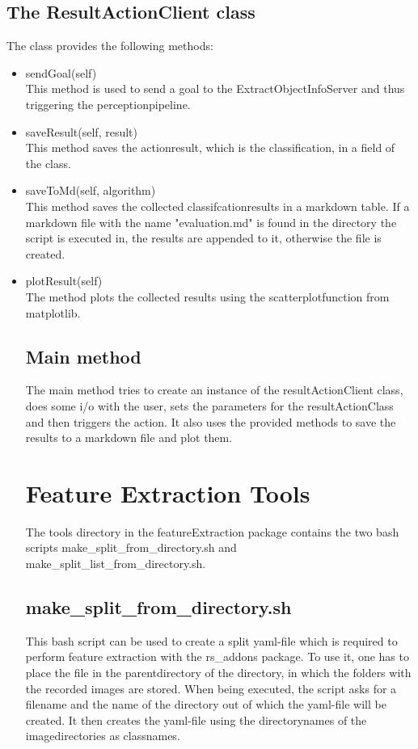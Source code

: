 \documentclass[main.tex]{subfiles}
\begin{document}
\subsection{The ResultActionClient class}
The class provides the following methods:

\begin{itemize}
\item 
sendGoal(self)\\
This method is used to send a goal to the ExtractObjectInfoServer and thus triggering the perceptionpipeline.

\item saveResult(self, result)\\
This method saves the actionresult, which is the classification, in a field of the class.

\item saveToMd(self, algorithm)\\
This method saves the collected classifcationresults in a markdown table. If a markdown file with the name "evaluation.md" is found in the directory the script is executed in, the results are appended to it, otherwise the file is created.

\item plotResult(self)\\
The method plots the collected results using the scatterplotfunction from matplotlib.

\subsection{Main method}
The main method tries to create an instance of the resultActionClient class, does some i/o with the user, sets the parameters for the resultActionClass and then triggers the action. It also uses the provided methods to save the results to a markdown file and plot them.

\section{Feature Extraction Tools}
The tools directory in the featureExtraction package contains the two bash scripts make\_split\_from\_directory.sh and make\_split\_list\_from\_directory.sh.

\subsection{make\_split\_from\_directory.sh} 
This bash script can be used to create a split yaml-file which is required to perform feature extraction with the rs\_addons package. To use it, one has to place the file in the parentdirectory of the directory, in which the folders with the recorded images are stored. When being executed, the script asks for a filename and the name of the directory out of which the yaml-file will be created. It then creates the yaml-file using the directorynames of the imagedirectories as classnames.


\end{itemize}
\end{document}
